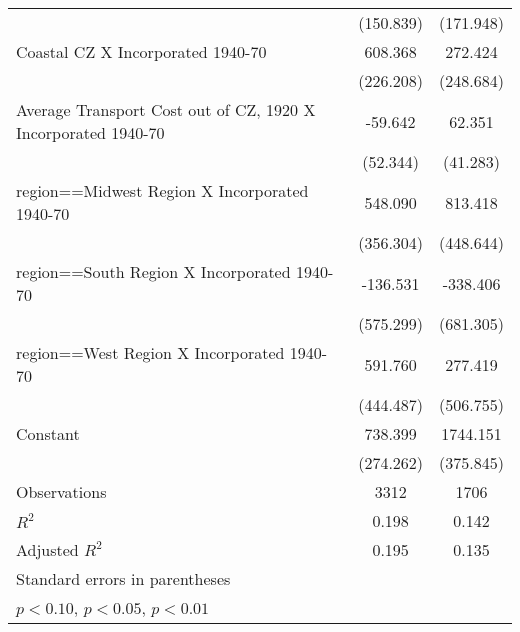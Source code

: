\begin{table}[htbp]
\begin{tabular}{l*{2}{c}}
                    &   (150.839)         &   (171.948)         \\
[1em]
Coastal CZ X Incorporated 1940-70&     608.368\sym{***}&     272.424         \\
                    &   (226.208)         &   (248.684)         \\
[1em]
Average Transport Cost out of CZ, 1920 X Incorporated 1940-70&     -59.642         &      62.351         \\
                    &    (52.344)         &    (41.283)         \\
[1em]
region==Midwest Region X Incorporated 1940-70&     548.090         &     813.418\sym{*}  \\
                    &   (356.304)         &   (448.644)         \\
[1em]
region==South Region X Incorporated 1940-70&    -136.531         &    -338.406         \\
                    &   (575.299)         &   (681.305)         \\
[1em]
region==West Region X Incorporated 1940-70&     591.760         &     277.419         \\
                    &   (444.487)         &   (506.755)         \\
[1em]
Constant            &     738.399\sym{***}&    1744.151\sym{***}\\
                    &   (274.262)         &   (375.845)         \\
\hline
Observations        &        3312         &        1706         \\
\(R^{2}\)           &       0.198         &       0.142         \\
Adjusted \(R^{2}\)  &       0.195         &       0.135         \\
\hline\hline
\multicolumn{3}{l}{\footnotesize Standard errors in parentheses}\\
\multicolumn{3}{l}{\footnotesize \sym{*} \(p<0.10\), \sym{**} \(p<0.05\), \sym{***} \(p<0.01\)}\\
\end{tabular}
\end{table}
